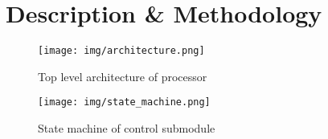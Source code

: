 \chapter{Description \& Methodology}

\begin{figure}[p]
    \centering
    \texttt{[image: img/architecture.png]}
    \caption{Top level architecture of processor}
    \label{fig:architecture}
\end{figure}

\begin{figure}[p]
    \centering
    \texttt{[image: img/state\_machine.png]}
    \caption{State machine of control submodule}
    \label{fig:state_machine}
\end{figure}

